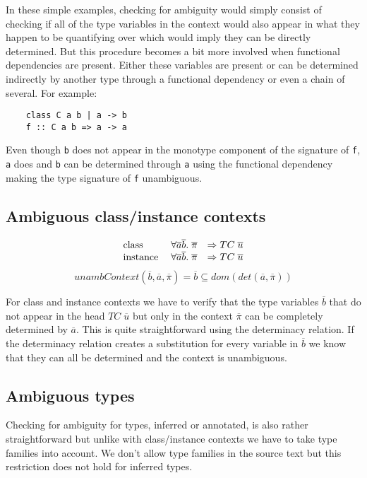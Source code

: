 In these simple examples, checking for ambiguity would simply consist of
checking if all of the type variables in the context would also appear in what
they happen to be quantifying over which would imply they can be directly
determined. But this procedure becomes a bit more involved when functional
dependencies are present. Either these variables are present or can be
determined indirectly by another type through a functional dependency or even a
chain of several. For example:
\begin{verbatim}
    class C a b | a -> b
    f :: C a b => a -> a
\end{verbatim}

Even though \texttt{b} does not appear in the monotype component of the
signature of \texttt{f}, \texttt{a} does and \texttt{b} can be determined
through \texttt{a} using the functional dependency making the type signature of
\texttt{f} unambiguous.

\subsection{Ambiguous class/instance contexts}

\[
\begin{array}{l l l}
\text{class} \; &\forall \overline{a} \overline{b}. \; \overline{\pi}
&\Rightarrow TC \; \overline{u}
\\
\text{instance} \; &\forall \overline{a} \overline{b}. \; \overline{\pi}
&\Rightarrow TC \; \overline{u}
\end{array}
\]
\[
unambContext(\overline{b},\overline{a},\overline{\pi}) = \overline{b} \subseteq
dom(det(\overline{a},\overline{\pi}))
\]

For class and instance contexts we have to verify that the type variables
$\overline{b}$ that do not appear in the head $TC \; \overline{u}$ but only in
the context $\overline{\pi}$ can be completely determined by $\overline{a}$.
This is quite straightforward using the determinacy relation. If the determinacy
relation creates a substitution for every variable in $\overline{b}$ we know
that they can all be determined and the context is unambiguous.

\subsection{Ambiguous types}

Checking for ambiguity for types, inferred or annotated, is also rather
straightforward but unlike with class/instance contexts we have to take type
families into account. We don't allow type families in the source text but this
restriction does not hold for inferred types.

